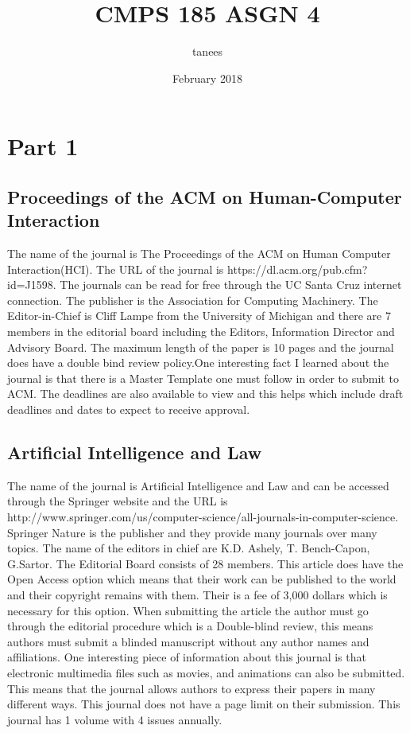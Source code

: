 \documentclass{article}
\title{CMPS 185 ASGN 4}
\author{tanees}
\date{February 2018}
\begin{document}
\maketitle

\section{Part 1}
\subsection{Proceedings of the ACM on Human-Computer Interaction}
The name of the journal is The Proceedings of the ACM on Human Computer Interaction(HCI). The URL of the journal is https://dl.acm.org/pub.cfm?id=J1598. The journals can be read for free through the UC Santa Cruz internet connection. The publisher is the Association for Computing Machinery. The Editor-in-Chief is Cliff Lampe from the University of Michigan and there are 7 members in the editorial board including the Editors, Information Director and Advisory Board. The maximum length of the paper is 10 pages and the journal does have a double bind review policy.One interesting fact I learned about the journal is that there is a Master Template one must follow in order to submit to ACM. The deadlines are also available to view and this helps which include draft deadlines and dates to expect to receive approval.


\subsection{Artificial Intelligence and Law}

The name of the journal is Artificial Intelligence and Law and can be accessed through the Springer website and the URL is http://www.springer.com/us/computer-science/all-journals-in-computer-science. Springer Nature is the publisher and they provide many journals over many topics. The name of the editors in chief are K.D. Ashely, T. Bench-Capon, G.Sartor. The Editorial Board consists of 28 members. This article does have the Open Access option which means that their work can be published to the world and their copyright remains with them. Their is a fee of 3,000 dollars which is necessary for this option. When submitting the article the author must go through the editorial procedure which is a Double-blind review, this means authors must submit a blinded manuscript without any author names and affiliations. One interesting piece of information about this journal is that electronic multimedia files such as movies, and animations can also be submitted. This means that the journal allows authors to express their papers in many different ways. This journal does not have a page limit on their submission. This journal has 1 volume with 4 issues annually.
\end{document}

